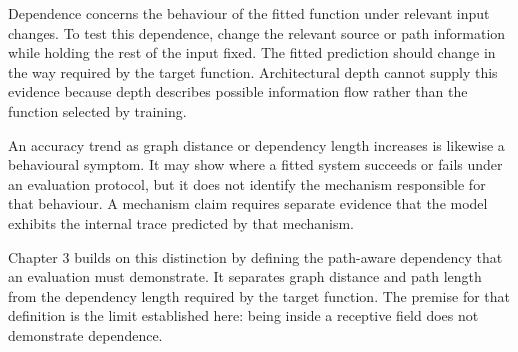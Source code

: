 Dependence concerns the behaviour of the fitted function under relevant input changes.
To test this dependence, change the relevant source or path information while holding the rest of the input fixed.
The fitted prediction should change in the way required by the target function.
Architectural depth cannot supply this evidence because depth describes possible information flow rather than the function selected by training.

An accuracy trend as graph distance or dependency length increases is likewise a behavioural symptom.
It may show where a fitted system succeeds or fails under an evaluation protocol, but it does not identify the mechanism responsible for that behaviour.
A mechanism claim requires separate evidence that the model exhibits the internal trace predicted by that mechanism.

Chapter 3 builds on this distinction by defining the path-aware dependency that an evaluation must demonstrate.
It separates graph distance and path length from the dependency length required by the target function.
The premise for that definition is the limit established here: being inside a receptive field does not demonstrate dependence.
